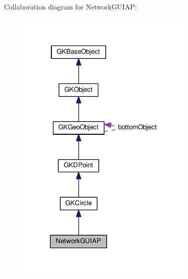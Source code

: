 Collaboration diagram for Network\+G\+U\+I\+AP\+:
\nopagebreak
\begin{figure}[H]
\begin{center}
\leavevmode
\includegraphics[width=241pt]{classNetworkGUIAP__coll__graph}
\end{center}
\end{figure}
